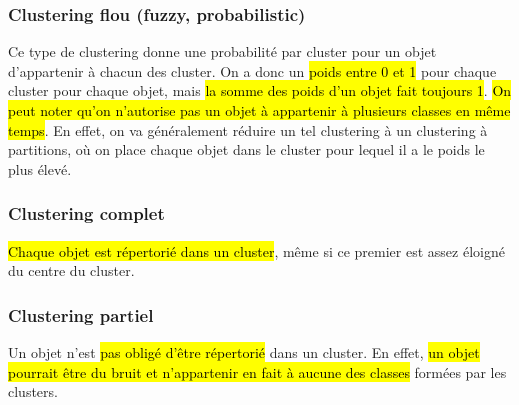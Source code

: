 \documentclass[letterpaper, 12pt]{article}
\newcommand{\alinea}{
\hspace*{0.5cm}}
\begin{document}
			\subsubsection{Clustering flou (fuzzy, probabilistic)}
				\alinea Ce type de clustering donne une probabilité par cluster
					pour un objet d'appartenir à chacun des cluster.
					On a donc un \hl{poids entre 0 et 1} pour chaque cluster
					pour chaque objet, mais \hl{la somme des poids d'un objet
					fait toujours 1}.\hl{ On peut noter qu'on n'autorise pas un 
					objet à appartenir à plusieurs classes en même temps}.
					En effet, on va généralement réduire un tel clustering à un
					clustering à partitions, où on place chaque objet dans le
					cluster pour lequel il a le poids le plus élevé.
			\subsubsection{Clustering complet}
				\alinea \hl{Chaque objet est répertorié dans un cluster}, même
					si ce premier est assez éloigné du centre du cluster.
			\subsubsection{Clustering partiel}
				\alinea Un objet n'est \hl{pas obligé d'être répertorié} 
					dans un
					cluster. En effet, \hl{un objet pourrait être du bruit
					et n'appartenir en fait à aucune des classes} formées
					par les clusters.
		\newpage
\end{document}
